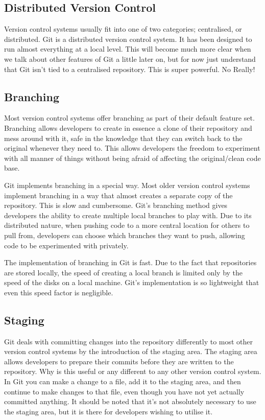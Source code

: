 \subsection{Distributed Version Control}
Version control systems usually fit into one of two categories; centralised, or distributed.
Git is a distributed version control system.
It has been designed to run almost everything at a local level.
This will become much more clear when we talk about other features of Git a little later on, but for now just understand that Git isn't tied to a centralised repository.
This is super powerful.
No Really!

\subsection{Branching}
Most version control systems offer branching as part of their default feature set.
Branching allows developers to create in essence a clone of their repository and mess around with it, safe in the knowledge that they can switch back to the original whenever they need to.
This allows developers the freedom to experiment with all manner of things without being afraid of affecting the original/clean code base.

Git implements branching in a special way.
Most older version control systems implement branching in a way that almost creates a separate copy of the repository.
This is slow and cumbersome.
Git's branching method gives developers the ability to create multiple local branches to play with.
Due to its distributed nature, when pushing code to a more central location for others to pull from, developers can choose which branches they want to push, allowing code to be experimented with privately.

The implementation of branching in Git is fast.
Due to the fact that repositories are stored locally, the speed of creating a local branch is limited only by the speed of the disks on a local machine.
Git's implementation is so lightweight that even this speed factor is negligible.

\subsection{Staging}
Git deals with committing changes into the repository differently to most other version control systems by the introduction of the staging area.
The staging area allows developers to prepare their commits before they are written to the repository.
Why is this useful or any different to any other version control system.
In Git you can make a change to a file, add it to the staging area, and then continue to make changes to that file, even though you have not yet actually committed anything.
It should be noted that it's not absolutely necessary to use the staging area, but it is there for developers wishing to utilise it.

